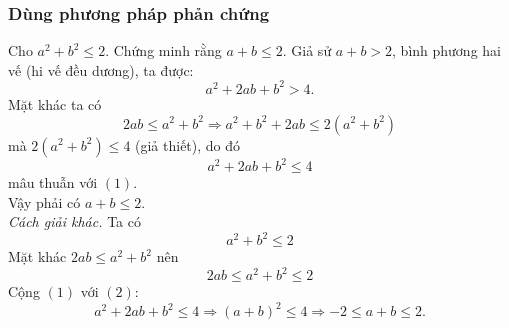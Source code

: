 \subsubsection{Dùng phương pháp phản chứng}
\begin{vd}%
Cho $a^2+b^2\leq 2$. Chứng minh rằng $a+b\leq 2.$
	\loigiai
	{
	Giả sử $a+b>2$, bình phương hai vế (hi vế đều dương), ta được:
	\[a^2+2ab+b^2>4.\tag{1}\]
	Mặt khác ta có 
	$$2ab\leq a^2+b^2\Rightarrow a^2+b^2+2ab\leq 2\left(a^2+b^2\right)$$
	mà $2\left(a^2+b^2\right)\leq 4$ (giả thiết), do đó
	\[a^2+2ab+b^2\leq 4\tag{2}\]
	mâu thuẫn với $(1)$.\\
	Vậy phải có $a+b\leq 2.$\\
	\textit{Cách giải khác.} Ta có 
	\[a^2+b^2\leq 2\tag{1}\]
	Mặt khác $2ab\leq a^2+b^2$ nên 
	\[2ab\leq a^2+b^2\leq 2\tag{2} \]
	Cộng $(1)$ với $(2)$:
	$$a^2+2ab+b^2\leq 4\Rightarrow \left(a+b\right)^2\leq 4\Rightarrow -2\leq a+b\leq 2.$$
	}
\end{vd}
